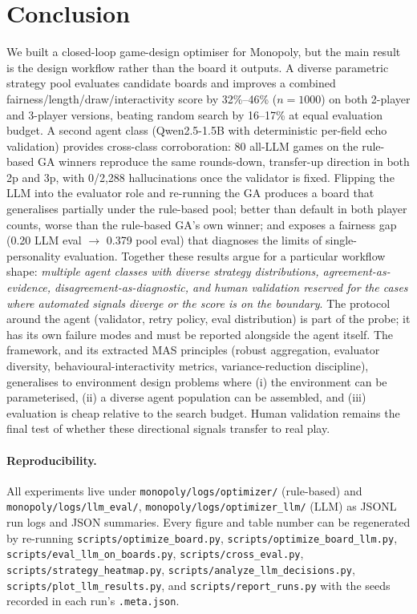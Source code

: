 \documentclass[10pt]{article}
\begin{document}
\section{Conclusion}

We built a closed-loop game-design optimiser for Monopoly, but the
main result is the design workflow rather than the board it outputs.
A diverse parametric strategy pool evaluates candidate boards and
improves a combined fairness/length/draw/interactivity score by
32\%--46\% ($n{=}1000$) on both 2-player and 3-player versions,
beating random search by 16--17\% at equal evaluation budget. A
second agent class (Qwen2.5-1.5B with deterministic per-field echo
validation) provides cross-class corroboration: 80 all-LLM games on
the rule-based GA winners reproduce the same rounds-down,
transfer-up direction in both 2p and 3p, with 0/2{,}288
hallucinations once the validator is fixed. Flipping the LLM into
the evaluator role and re-running the GA produces a board that
generalises partially under the rule-based pool; better than
default in both player counts, worse than the rule-based GA's own
winner; and exposes a fairness gap (0.20 LLM eval $\to$ 0.379
pool eval) that diagnoses the limits of single-personality
evaluation. Together these results argue for a particular workflow
shape: \emph{multiple agent classes with diverse strategy
distributions, agreement-as-evidence, disagreement-as-diagnostic, and
human validation reserved for the cases where automated signals
diverge or the score is on the boundary}. The protocol around the
agent (validator, retry policy, eval distribution) is part of the
probe; it has its own failure modes and must be reported alongside
the agent itself. The framework, and its extracted MAS principles
(robust aggregation, evaluator diversity, behavioural-interactivity
metrics, variance-reduction discipline), generalises to environment
design problems where (i) the environment can be parameterised, (ii)
a diverse agent population can be assembled, and (iii) evaluation is
cheap relative to the search budget. Human validation remains the
final test of whether these directional signals transfer to real
play.

\paragraph{Reproducibility.} All experiments live under
\texttt{monopoly/logs/optimizer/} (rule-based) and
\texttt{monopoly/logs/llm\_eval/}, \texttt{monopoly/logs/optimizer\_llm/}
(LLM) as JSONL run logs and JSON summaries. Every figure and table
number can be regenerated by re-running
\texttt{scripts/optimize\_board.py},
\texttt{scripts/optimize\_board\_llm.py},
\texttt{scripts/eval\_llm\_on\_boards.py},
\texttt{scripts/cross\_eval.py},
\texttt{scripts/strategy\_heatmap.py},
\texttt{scripts/analyze\_llm\_decisions.py},
\texttt{scripts/plot\_llm\_results.py}, and
\texttt{scripts/report\_runs.py}
with the seeds recorded in each run's \texttt{.meta.json}.
\end{document}
